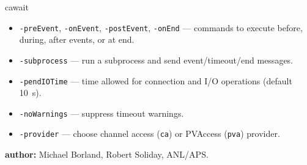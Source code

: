 \begin{sddsprog}{cawait}
\begin{itemize}
  \item {\tt -preEvent}, {\tt -onEvent}, {\tt -postEvent}, {\tt -onEnd} --- commands to execute before, during, after events, or at end.
  \item {\tt -subprocess} --- run a subprocess and send event/timeout/end messages.
  \item {\tt -pendIOTime} --- time allowed for connection and I/O operations (default 10~s).
  \item {\tt -noWarnings} --- suppress timeout warnings.
  \item {\tt -provider} --- choose channel access ({\tt ca}) or PVAccess ({\tt pva}) provider.
\end{itemize}
\item \textbf{author:} Michael Borland, Robert Soliday, ANL/APS.
\end{sddsprog}
